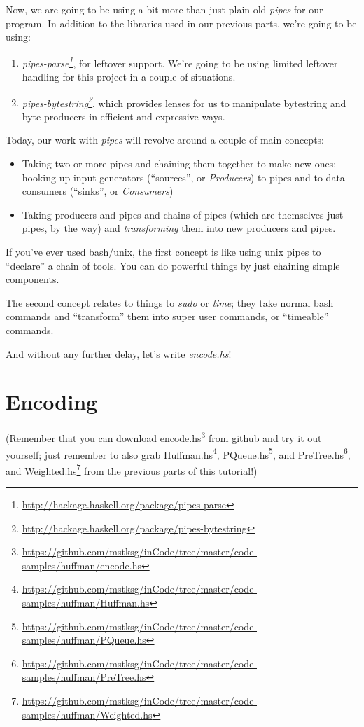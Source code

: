 \documentclass[]{article}
\renewcommand{\href}[2]{#2\footnote{\url{#1}}}
\begin{document}
Now, we are going to be using a bit more than just plain old \emph{pipes} for
our program. In addition to the libraries used in our previous parts, we're
going to be using:

\begin{enumerate}
\def\labelenumi{\arabic{enumi}.}
\tightlist
\item
  \emph{\href{http://hackage.haskell.org/package/pipes-parse}{pipes-parse}}, for
  leftover support. We're going to be using limited leftover handling for this
  project in a couple of situations.
\item
  \emph{\href{http://hackage.haskell.org/package/pipes-bytestring}{pipes-bytestring}},
  which provides lenses for us to manipulate bytestring and byte producers in
  efficient and expressive ways.
\end{enumerate}

Today, our work with \emph{pipes} will revolve around a couple of main concepts:

\begin{itemize}
\item
  Taking two or more pipes and chaining them together to make new ones; hooking
  up input generators (``sources'', or \emph{Producers}) to pipes and to data
  consumers (``sinks'', or \emph{Consumers})
\item
  Taking producers and pipes and chains of pipes (which are themselves just
  pipes, by the way) and \emph{transforming} them into new producers and pipes.
\end{itemize}

If you've ever used bash/unix, the first concept is like using unix pipes to
``declare'' a chain of tools. You can do powerful things by just chaining simple
components.

The second concept relates to things to \emph{sudo} or \emph{time}; they take
normal bash commands and ``transform'' them into super user commands, or
``timeable'' commands.

And without any further delay, let's write \emph{encode.hs}!

\hypertarget{encoding}{%
\section{Encoding}\label{encoding}}

(Remember that you can download
\href{https://github.com/mstksg/inCode/tree/master/code-samples/huffman/encode.hs}{encode.hs}
from github and try it out yourself; just remember to also grab
\href{https://github.com/mstksg/inCode/tree/master/code-samples/huffman/Huffman.hs}{Huffman.hs},
\href{https://github.com/mstksg/inCode/tree/master/code-samples/huffman/PQueue.hs}{PQueue.hs},
and
\href{https://github.com/mstksg/inCode/tree/master/code-samples/huffman/PreTree.hs}{PreTree.hs},
and
\href{https://github.com/mstksg/inCode/tree/master/code-samples/huffman/Weighted.hs}{Weighted.hs}
from the previous parts of this tutorial!)
\end{document}
